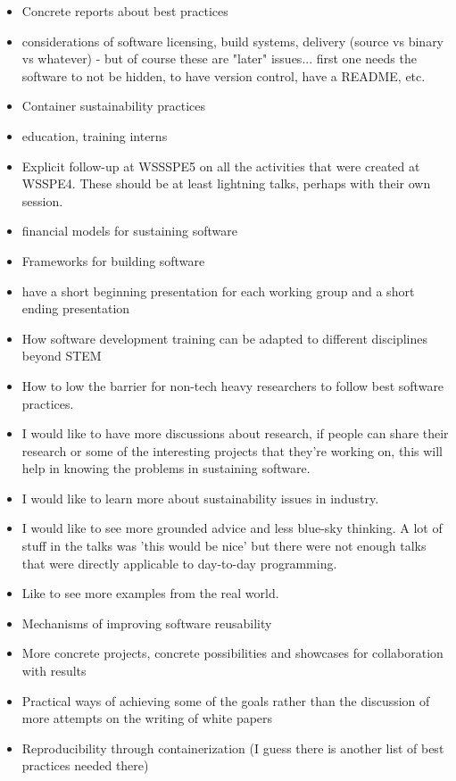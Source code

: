 \begin{itemize}
\item Concrete reports about best practices
\item considerations of software licensing, build systems, delivery (source vs binary vs whatever) - but of course these are "later" issues... first one needs the software to not be hidden, to have version control, have a README, etc.
\item Container sustainability practices
\item education, training interns
\item Explicit follow-up at WSSSPE5 on all the activities that were created at WSSPE4.  These should be at least lightning talks, perhaps with their own session.
\item financial models for sustaining software
\item Frameworks for building software
\item have a short beginning presentation for each working group and a short ending presentation
\item How software development training can be adapted to different disciplines beyond STEM
\item How to low the barrier for non-tech heavy researchers to follow best software practices.
\item I would like to have more discussions about research, if people can share their research or some of the interesting projects that they're working on, this will help in knowing the problems in sustaining software.
\item I would like to learn more about sustainability issues in industry.
\item I would like to see more grounded advice and less blue-sky thinking. A lot of stuff in the talks was 'this would be nice' but there were not enough talks that were directly applicable to day-to-day programming.
\item Like to see more examples from the real world.  
\item Mechanisms of improving software reusability
\item More concrete projects, concrete possibilities and showcases for collaboration with results
\item Practical ways of achieving some of the goals rather than the discussion of more attempts on the writing of white papers
\item Reproducibility through containerization (I guess there is another list of best practices needed there)

\end{itemize}
